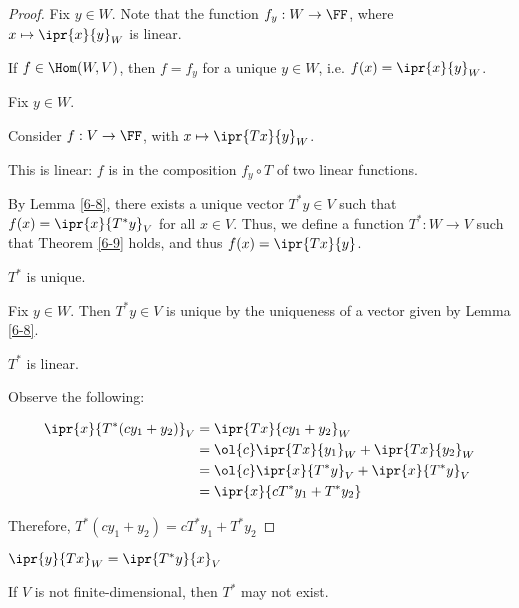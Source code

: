 \documentclass[11pt]{scrartcl}
\begin{document}
\begin{proof}
  Fix $y\in W$. Note that the function $f_y: W\to\FF$, where
  $x\mapsto \ipr{x}{y}_W$ is linear.
  \begin{lemma}
    \label{6-8}
  If $f \in \Hom(W,V)$, then $f = f_y$ for a unique $y\in W$,
  i.e. $f(x) = \ipr{x}{y}_W$.
  \end{lemma}
    Fix $y \in W$.

    Consider $f:V\to \FF$, with $x\mapsto \ipr{Tx}{y}_W$.

    This is linear: $f$ is in the composition $f_y\circ T$ of two
    linear functions.

    By Lemma \ref{6-8}, there exists a unique vector $T^{*}y \in V$
    such that $f(x) = \ipr{x}{T^{*}y}_{V}$ for all $x\in V$.  Thus, we
    define a function $T^{*}:W\to V$ such that Theorem \ref{6-9} holds,
    and thus $f(x) = \ipr{Tx}{y}$.

    \begin{claim*}
      $T^{*}$ is unique.
    \end{claim*}

      Fix $y\in W$. Then $T^{*}y \in V$ is unique by the uniqueness of
      a vector given by Lemma \ref{6-8}.


    \begin{claim*}
      $T^{*}$ is linear.
    \end{claim*}


      Observe the following:

      \begin{align}
        \ipr{x}{T^{*}(cy_1+y_2)}_V & = \ipr{Tx}{cy_1+y_2}_W                      \\
                                   & =\ol{c}\ipr{Tx}{y_1}_W+\ipr{Tx}{y_2}_W      \\
                                   & = \ol{c}\ipr{x}{T^{*}y}_V+\ipr{x}{T^{*}y}_V \\
                                   & =\ipr{x}{cT^{*}y_1+T^{*}y_2}
      \end{align}

      Therefore, $T^{*}(cy_1+y_2) = cT^{*}y_1 + T^{*}y_2$


\end{proof}

\begin{remark}
  $\ipr{y}{Tx}_W=\ipr{T^{*}y}{x}_V$
\end{remark}
\begin{remark}
  If $V$ is not finite-dimensional, then $T^{*}$ may not exist.
\end{remark}
\end{document}
